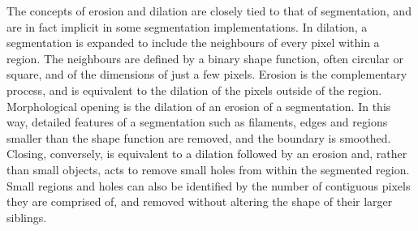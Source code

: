     The concepts of erosion and dilation are closely tied to that of segmentation, and are in fact implicit in some segmentation implementations. In dilation, a segmentation is expanded to include the neighbours of every pixel within a region. The neighbours are defined by a binary shape function, often circular or square, and of the dimensions of just a few pixels. Erosion is the complementary process, and is equivalent to the dilation of the pixels outside of the region. Morphological opening is the dilation of an erosion of a segmentation. In this way, detailed features of a segmentation such as filaments, edges and regions smaller than the shape function are removed, and the boundary is smoothed. Closing, conversely, is equivalent to a dilation followed by an erosion and, rather than small objects, acts to remove small holes from within the segmented region. Small regions and holes can also be identified by the number of contiguous pixels they are comprised of, and removed without altering the shape of their larger siblings.
    
